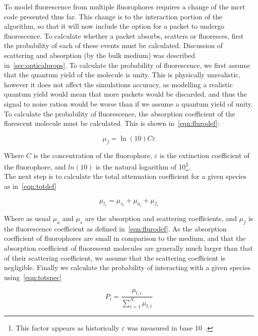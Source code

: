 To model fluorescence from multiple fluorophores requires a change of the \gls*{mcrt} code presented thus far.
This change is to the interaction portion of the algorithm, so that it will now include the option for a packet to undergo fluorescence.
To calculate whether a packet absorbs, scatters or fluoresces, first the probability of each of these events must be calculated.
Discussion of scattering and absorption (by the bulk medium) was described in~\cref{sec:opticalprops}.
To calculate the probability of fluorescence, we first assume that the quantum yield of the molecule is unity.
This is physically unrealistic, however it does not affect the simulations accuracy, as modelling a realistic quantum yield would mean that more packets would be discarded, and thus the signal to noise ration would be worse than if we assume a quantum yield of unity.
To calculate the probability of fluorescence, the absorption coefficient of the florescent molecule must be calculated.
This is shown in~\cref{eqn:flurodef}:

\begin{equation}
\mu_f=\ln\left(10\right) C \varepsilon
\label{eqn:flurodef}
\end{equation}

Where $C$ is the concentration of the fluorophore, $\varepsilon$ is the extinction coefficient of the fluorophore, and $ln(10)$ is the natural logarithm of 10\footnote{This factor appears as historically $\varepsilon$ was measured in base 10~\cite{jacques2013optical}.}.\\

The next step is to calculate the total attenuation coefficient for a given species as in~\cref{eqn:totdef}

\begin{equation}
\mu_{t_i}=\mu_{s_i}+\mu_{a_i}+\mu_{f_i}
\label{eqn:totdef}
\end{equation}

Where as usual $\mu_a$ and $\mu_s$ are the absorption and scattering coefficients, and $\mu_f$ is the fluorescence coefficient as defined in~\cref{eqn:flurodef}.
As the absorption coefficient of fluorophores are small in comparison to the medium, and that the absorption coefficient of fluorescent molecules are generally much larger than that of their scattering coefficient, we assume that the scattering coefficient is negligible.
Finally we calculate the probability of interacting with a given species using~\cref{eqn:totspec}

\begin{equation}
P_i=\frac{\mu_{t,i}}{\sum\limits_{i=1}^{N} \mu_{t,i}}
\label{eqn:totspec}
\end{equation}


